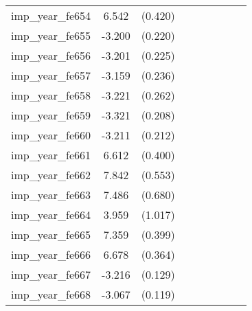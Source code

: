 {\begin{tabular}{l*{4}{cc}}
imp\_year\_fe654&    6.542\sym{***}&  (0.420)&                  &         &                  &         &                  &         \\
imp\_year\_fe655&   -3.200\sym{***}&  (0.220)&                  &         &                  &         &                  &         \\
imp\_year\_fe656&   -3.201\sym{***}&  (0.225)&                  &         &                  &         &                  &         \\
imp\_year\_fe657&   -3.159\sym{***}&  (0.236)&                  &         &                  &         &                  &         \\
imp\_year\_fe658&   -3.221\sym{***}&  (0.262)&                  &         &                  &         &                  &         \\
imp\_year\_fe659&   -3.321\sym{***}&  (0.208)&                  &         &                  &         &                  &         \\
imp\_year\_fe660&   -3.211\sym{***}&  (0.212)&                  &         &                  &         &                  &         \\
imp\_year\_fe661&    6.612\sym{***}&  (0.400)&                  &         &                  &         &                  &         \\
imp\_year\_fe662&    7.842\sym{***}&  (0.553)&                  &         &                  &         &                  &         \\
imp\_year\_fe663&    7.486\sym{***}&  (0.680)&                  &         &                  &         &                  &         \\
imp\_year\_fe664&    3.959\sym{***}&  (1.017)&                  &         &                  &         &                  &         \\
imp\_year\_fe665&    7.359\sym{***}&  (0.399)&                  &         &                  &         &                  &         \\
imp\_year\_fe666&    6.678\sym{***}&  (0.364)&                  &         &                  &         &                  &         \\
imp\_year\_fe667&   -3.216\sym{***}&  (0.129)&                  &         &                  &         &                  &         \\
imp\_year\_fe668&   -3.067\sym{***}&  (0.119)&                  &         &                  &         &                  &         \\

\end{tabular}}
